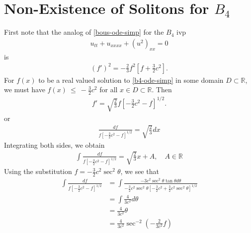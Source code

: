 \documentclass[12pt,reqno]{amsart}
\numberwithin{equation}{section}  %
\newcommand{\rr}{\mathbb{R}}
\begin{document}
\section{Non-Existence of Solitons for $B_{4}$} 
\label{sec:B4-soliton-fail}
%
%
First note that the
analog of \eqref{bous-ode-simp} for the $B_{4}$ ivp
\begin{equation}
  \label{b4}
\begin{split}
  u_{tt} + u_{xxxx} + (u^{2})_{xx} = 0
\end{split}
\end{equation}
is
\begin{equation}
  \label{b4-ode-simp}
\begin{split}
  (f')^{2} = -\frac{2}{3} f^{2} \left [ f + \frac{3}{2}c^{2}\right ]. 
\end{split}
\end{equation}
For $f(x)$ to be a real valued solution to \eqref{b4-ode-simp} in some domain
$D \subset \rr$, we must have $f(x)~\le~-\frac{3}{2}c^{2}$ for all
$x \in D \subset \rr$. Then 
%
\begin{equation*}
\begin{split}
  f' = \sqrt{\frac{2}{3}}f \left[ -\frac{3}{2}c^{2} -f \right]^{1/2}.
\end{split}
\end{equation*}
%
%
or
%
%
\begin{equation*}
\begin{split}
\frac{df}{ f \left[ -\frac{3}{2}c^{2} -f \right]^{1/2}} = \sqrt{\frac{2}{3}}
dx
\end{split}
\end{equation*}
%
Integrating both sides, we obtain
%
%
%
%
\begin{equation*}
\begin{split}
\int \frac{df}{ f \left[ -\frac{3}{2}c^{2} -f \right]^{1/2}} = \sqrt{\frac{2}{3}}
x + A, \quad A \in \rr
\end{split}
\end{equation*}
%
%
Using the substitution $f = -\frac{3}{2}c^{2}\sec^{2} \theta$, we see that
%
%
\begin{equation*}
\begin{split}
\int \frac{df}{ f \left[ -\frac{3}{2}c^{2} -f \right]^{1/2}} 
& = \int \frac{-3 c^{2} \sec^{2}\theta \tan \theta d
\theta}{-\frac{3}{2}c^{2} \sec^{2} \theta \left[ -\frac{3}{2}c^{2} +
\frac{3}{2}c^{2} \sec^{2} \theta \right]^{1/2}}
\\
& = \int \frac{4}{3c^{2}} d \theta
\\
& = \frac{4}{3c^{2}} \theta
\\
& = \frac{4}{3c^{2}} \sec^{-2}\left (-\frac{2}{3c^{2}}f \right )
\end{split}
\end{equation*}
\end{document}
